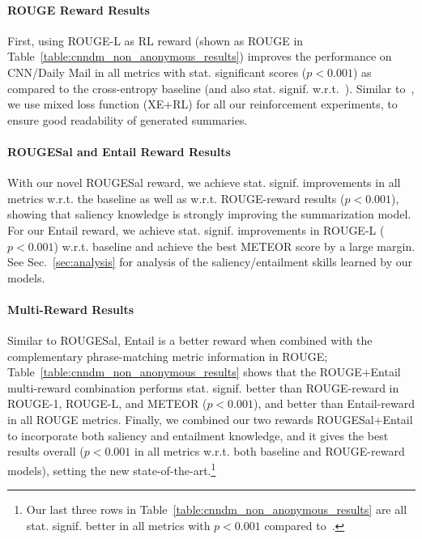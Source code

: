 \documentclass[11pt,a4paper]{article}
\begin{document}
\paragraph{ROUGE Reward Results}
First, using ROUGE-L as RL reward (shown as ROUGE in Table~\ref{table:cnndm_non_anonymous_results}) improves the performance on CNN/Daily Mail in all metrics with stat. significant scores ($p<0.001$) as compared to the cross-entropy baseline (and also stat. signif. w.r.t.~). Similar to~, we use mixed loss function (XE+RL) for all our reinforcement experiments, to ensure good readability of generated summaries.

\paragraph{ROUGESal and Entail Reward Results}
With our novel ROUGESal reward, we achieve stat. signif. improvements in all metrics w.r.t. the baseline as well as w.r.t. ROUGE-reward results ($p<0.001$), showing that saliency knowledge is strongly improving the summarization model. For our Entail reward, we achieve stat. signif. improvements in ROUGE-L ($p<0.001$) w.r.t. baseline and achieve the best METEOR score by a large margin. See Sec.~\ref{sec:analysis} for analysis of the saliency/entailment skills learned by our models.



\paragraph{Multi-Reward Results}
Similar to ROUGESal, Entail is a better reward when combined with the complementary phrase-matching metric information in ROUGE; Table~\ref{table:cnndm_non_anonymous_results} shows that the ROUGE+Entail multi-reward combination performs stat. signif. better than ROUGE-reward in ROUGE-1, ROUGE-L, and METEOR ($p<0.001$), and better than Entail-reward in all ROUGE metrics. Finally, we combined our two rewards ROUGESal+Entail to incorporate both saliency and entailment knowledge, and it gives the best results overall ($p<0.001$ in all metrics w.r.t. both baseline and ROUGE-reward models), setting the new state-of-the-art.\footnote{Our last three rows in Table~\ref{table:cnndm_non_anonymous_results} are all stat. signif. better in all metrics with $p<0.001$ compared to~.}
\end{document}
